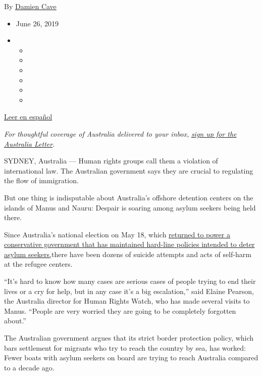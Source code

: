 By \href{https://www.nytimes3xbfgragh.onion/by/damien-cave}{Damien Cave}

\begin{itemize}
\item
  June 26, 2019
\item
  \begin{itemize}
  \item
  \item
  \item
  \item
  \item
  \item
  \end{itemize}
\end{itemize}

\href{https://www.nytimes3xbfgragh.onion/es/2019/06/30/detencion-extraterritorial-australia/}{Leer
en español}

\emph{For thoughtful coverage of Australia delivered to your inbox,}
\href{https://www.nytimes3xbfgragh.onion/newsletters/australia-letter?module=inline}{\emph{sign
up for the Australia Letter}}\emph{.}

SYDNEY, Australia --- Human rights groups call them a violation of
international law. The Australian government says they are crucial to
regulating the flow of immigration.

But one thing is indisputable about Australia's offshore detention
centers on the islands of Manus and Nauru: Despair is soaring among
asylum seekers being held there.

Since Australia's national election on May 18, which
\href{https://www.nytimes3xbfgragh.onion/2019/05/18/world/australia/election-results-scott-morrison.html}{returned
to power a conservative government that has maintained hard-line
policies intended to deter asylum seekers,}there have been dozens of
suicide attempts and acts of self-harm at the refugee centers.

``It's hard to know how many cases are serious cases of people trying to
end their lives or a cry for help, but in any case it's a big
escalation,'' said Elaine Pearson, the Australia director for Human
Rights Watch, who has made several visits to Manus. ``People are very
worried they are going to be completely forgotten about.''

The Australian government argues that its strict border protection
policy, which bars settlement for migrants who try to reach the country
by sea, has worked: Fewer boats with asylum seekers on board are trying
to reach Australia compared to a decade ago.

